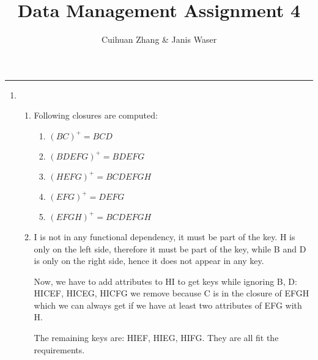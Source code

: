 \documentclass[12pt]{extarticle}
\title{Data Management Assignment 4}
\author{Cuihuan Zhang \& Janis Waser}
\begin{document}
\maketitle \vspace{-10mm}
\rule{\linewidth}{0.4pt}


\begin{flushleft}
\begin{enumerate}

\item

\begin{enumerate}
\item Following closures are computed:


\begin{enumerate}

\item  $(BC)^+=BCD$
\item $(BDEFG)^+=BDEFG$
\item $(HEFG)^+=BCDEFGH$
\item $(EFG)^+=DEFG$
\item $(EFGH)^+=BCDEFGH$
\end{enumerate}
\item I is not in any functional dependency, it must be part of the key. H is only on the left side, therefore it must be part of the key, while B and D is only on the right side, hence it does not appear in any key. 

Now, we have to add attributes to HI to get keys while ignoring B, D:
HICEF, HICEG, HICFG we remove because C is in the closure of EFGH which we can always get if we have at least two attributes of EFG with H. 

The remaining keys are: HIEF, HIEG, HIFG. They are all fit the requirements.
\end{enumerate}




\end{enumerate}
\end{flushleft}
\end{document}

